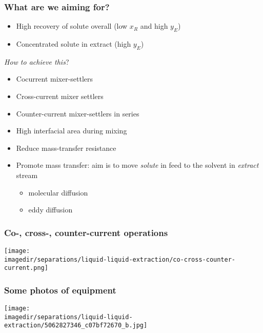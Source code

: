 \begin{frame}\frametitle{What are we aiming for?}
	\begin{exampleblock}{{\color{myRed}{Main aims}}}
		\begin{itemize}
			\item	High recovery of solute overall (low $x_R$ and high $y_E$)
			\item	Concentrated solute in extract (high $y_E$)
		\end{itemize}
	\end{exampleblock}
	\vspace{12pt}
	\emph{How to achieve this}?
	\begin{itemize}
		\item	Cocurrent mixer-settlers
		\item	Cross-current mixer settlers
		\item	Counter-current mixer-settlers in series
		\item	High interfacial area during mixing
		\item	Reduce mass-transfer resistance
		\item	Promote mass transfer: aim is to move \emph{solute} in feed to the solvent in \emph{extract} stream
		\begin{itemize}
			\item	molecular diffusion \hfill {\color{myOrange}{$\leftarrow$ microscopic movement}}
			\item	eddy diffusion  \hfill {\color{myOrange}{$\leftarrow$ orders of magnitude greater}}
		\end{itemize}
	\end{itemize}
\end{frame}

\begin{frame}\frametitle{Co-, cross-, counter-current operations}
	\begin{center}
		\texttt{[image: \\imagedir/separations/liquid-liquid-extraction/co-cross-counter-current.png]}
	\end{center}

\end{frame}

\begin{frame}\frametitle{Some photos of equipment}
	\begin{center}
		\texttt{[image: \\imagedir/separations/liquid-liquid-extraction/5062827346\_c07bf72670\_b.jpg]}
	\end{center}
\end{frame}

